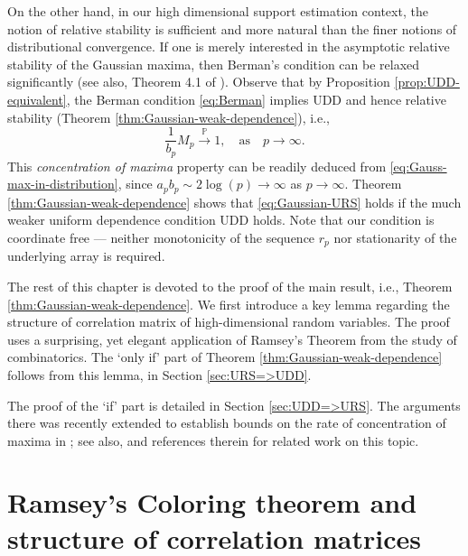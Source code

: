 On the other hand, in our high dimensional support estimation context, the notion of relative stability is sufficient and more natural than the finer notions of distributional convergence.
If one is merely interested in the asymptotic relative stability of the Gaussian maxima, then Berman's condition can be relaxed significantly (see also, Theorem 4.1 of \cite{berman1964limit}). 
Observe that by Proposition \ref{prop:UDD-equivalent},  the Berman condition \eqref{eq:Berman} implies UDD and hence relative stability (Theorem \ref{thm:Gaussian-weak-dependence}), i.e., 
\begin{equation} \label{eq:Gaussian-URS}
  \frac{1}{b_p} M_p \stackrel{\mathbb P}{\to} 1,\quad\mbox{as}\quad p\to\infty.
\end{equation}
This {\em concentration of maxima} property can be readily deduced from \eqref{eq:Gauss-max-in-distribution}, since $a_p b_p \sim 2\log(p) \to \infty$ as $p\to\infty$.
Theorem \ref{thm:Gaussian-weak-dependence} shows that \eqref{eq:Gaussian-URS} holds if the much weaker uniform dependence condition UDD holds. 
Note that our condition is coordinate free --- neither monotonicity of the sequence $r_p$ nor stationarity of the underlying array is required. 


\medskip

The rest of this chapter is devoted to the proof of the main result, i.e., Theorem \ref{thm:Gaussian-weak-dependence}. 
We first introduce a key lemma regarding the structure of correlation matrix of high-dimensional random variables.
The proof uses a surprising, yet elegant application of Ramsey's Theorem from the study of combinatorics.
The `only if' part of Theorem \ref{thm:Gaussian-weak-dependence} follows from this lemma, in Section \ref{sec:URS=>UDD}. 

The proof of the `if' part is detailed in Section \ref{sec:UDD=>URS}.
The arguments there was recently extended to establish bounds on the rate of concentration of maxima in \cite{kartsioukas2019rate}; see also, \cite{tanguy2015some} and references therein for related work on this topic.

\section{Ramsey's Coloring theorem and structure of correlation matrices} 
\label{sec:Ramsey}


